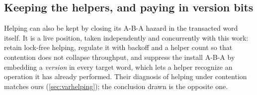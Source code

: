 \documentclass[11pt]{article}
\begin{document}

\subsection{Keeping the helpers, and paying in version bits}
\label{sec:varversion}

Helping can also be kept by closing its A-B-A hazard in the transacted word
itself. It is a live position, taken
independently and concurrently with this work: \citet{unno2026helping} retain
lock-free helping, regulate it with backoff and a helper count so that contention
does not collapse throughput, and suppress the install A-B-A by embedding a
\emph{version} in every target word, which lets a helper recognize an operation
it has already performed. Their diagnosis of helping under contention matches
ours (\cref{sec:varhelping}); the conclusion drawn is the opposite one.
\end{document}
